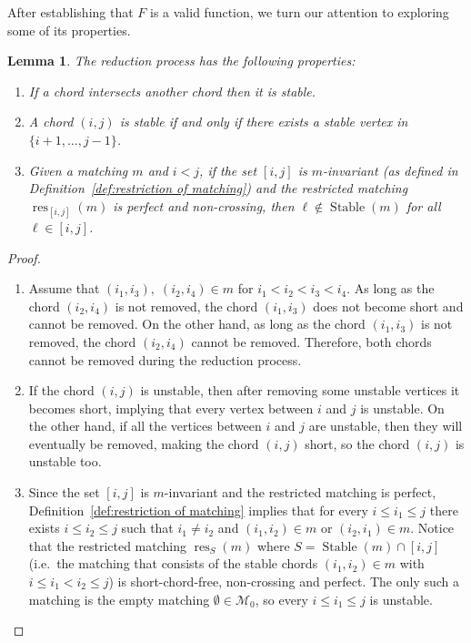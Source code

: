 \documentclass[11pt]{article}
\newtheorem{lemma}[theo]{Lemma}
\theoremstyle{definition}
\providecommand{\ie}{i.e.\ }
\numberwithin{equation}{section}
\newcommand{\Stable}{\operatorname{Stable}}
\newcommand{\res}{\operatorname{res}}
\newcommand{\M}{\mathcal{M}}
\begin{document}
After establishing that $F$ is a valid function, we turn our attention to exploring some of its properties.

\begin{lemma}
\label{lem:properties of core}
    The reduction process has the following properties:
    \begin{enumerate}[label=(\arabic*), ref=\ref{lem:properties of core}\text{ (part~}\arabic*)]
        \item \label{lem:properties of core--intersect stable} If a chord intersects another chord then it is stable.
        \item \label{lem:properties of core--chord unstable iff all midpoints unstable} A chord $(i,j)$ is stable if and only if there exists a stable vertex in $\{i+1,\dots,j-1\}$.
        \item \label{lem:properties of core--perfect non-crossing unstable} Given a matching $m$ and $i < j$, if the set $[i,j]$ is $m$-invariant \textup{(}as defined in Definition~\ref{def:restriction of matching}\textup{)} and the restricted matching $\res_{[i,j]}(m)$ is perfect and non-crossing, then $\ell \notin \Stable(m)$ for all $\ell \in [i,j]$.
    \end{enumerate}
\end{lemma}

\begin{proof} \hfill %
    \begin{enumerate}
        \item Assume that $(i_1,i_3),\; (i_2,i_4) \in m$ for $i_1 < i_2 < i_3 < i_4$. As long as the chord $(i_2,i_4)$ is not removed, the chord $(i_1,i_3)$ does not become short and cannot be removed. On the other hand, as long as the chord $(i_1,i_3)$ is not removed, the chord $(i_2,i_4)$ cannot be removed. Therefore, both chords cannot be removed during the reduction process.
        \item If the chord $(i,j)$ is unstable, then after removing some unstable vertices it becomes short, implying that every vertex between $i$ and $j$ is unstable. On the other hand, 
        if all the vertices between $i$ and $j$ are unstable, then they will eventually be removed, making the chord $(i,j)$ short, so the chord $(i,j)$ is unstable too.
        \item %
        Since the set $[i,j]$ is $m$-invariant and the restricted matching is perfect, Definition~\ref{def:restriction of matching} implies that for every $i \le i_1 \le j$ there exists $i \le i_2 \le j$ such that $i_1 \ne i_2$ and $(i_1,i_2) \in m$ or $(i_2,i_1) \in m$.
        Notice that the restricted matching $\res_S(m)$ where $S = \Stable(m) \cap [i,j]$ (\ie the matching that consists of the stable chords $(i_1,i_2) \in m$ with $i \le i_1<i_2 \le j$) is short-chord-free, non-crossing and perfect. The only such a matching is the empty matching $\emptyset \in \M_0$, so every $i \le i_1 \le j$ is unstable.
        \qedhere
    \end{enumerate}
\end{proof}
\end{document}
